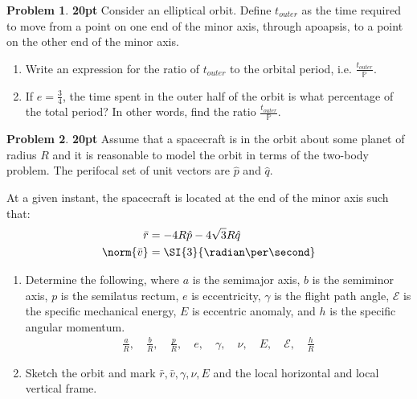 \documentclass[10pt]{article}
\theoremstyle{definition}
\newtheorem{prob}{Problem}[section]
\newenvironment{subprob}%
{\renewcommand{\theenumi}{\alph{enumi}}\renewcommand{\labelenumi}{(\theenumi)}\begin{enumerate}}%
{\end{enumerate}}%
\begin{document}
\clearpage\newpage
\null\newpage
\null\newpage
\begin{prob}
    \textbf{20pt}
Consider an elliptical  orbit.
Define \( t_{outer} \) as the time required to move from a point on one end of the minor axis, through apoapsis, to a point on the other end of the minor axis.

\begin{subprob}
    \item Write an expression for the ratio of \( t_{outer} \) to the orbital period, i.e. \(\frac{t_{outer}}{\mathbb{P}}\).
    \item If \( e = \frac{3}{4} \), the time spent in the outer half of the orbit is what percentage of the total period? In other words, find the ratio \( \frac{t_{outer}}{\mathbb{P}} \).
\end{subprob}
\end{prob}

\clearpage\newpage
\null\newpage
\null\newpage
\begin{prob}
    \textbf{20pt}
    Assume that a spacecraft is in the orbit about some planet of radius \( R\) and it is reasonable to model the orbit in terms of the two-body problem.
    The perifocal set of unit vectors are \( \hat p \) and \( \hat q \).

    At a given instant, the spacecraft is located at the end of the minor axis such that:
    \begin{align*}
        \bar r &= -4 R \hat p - 4 \sqrt{3} R \hat q \\
        \norm{\bar v} &= \SI{3}{\radian\per\second}
    \end{align*}

\begin{subprob}
\item Determine the following, where \( a \) is the semimajor axis, \( b \) is the semiminor axis, \( p \) is the semilatus rectum, \( e \) is eccentricity, \( \gamma \) is the flight path angle, \( \mathcal{E} \) is the specific mechanical energy, \( E \) is eccentric anomaly, and \( h \) is the specific angular momentum.
        \begin{align*}
            \frac{a}{R}, \quad \frac{b}{R}, \quad \frac{p}{R}, \quad e, \quad \gamma, \quad \nu, \quad E, \quad \mathcal{E}, \quad \frac{h}{R}
        \end{align*}
    \item Sketch the orbit and mark \( \bar r, \bar v , \gamma, \nu, E\) and the local horizontal and local vertical frame.
\end{subprob}
\end{prob}
\clearpage\newpage
\null\newpage
\null\newpage
\end{document}
